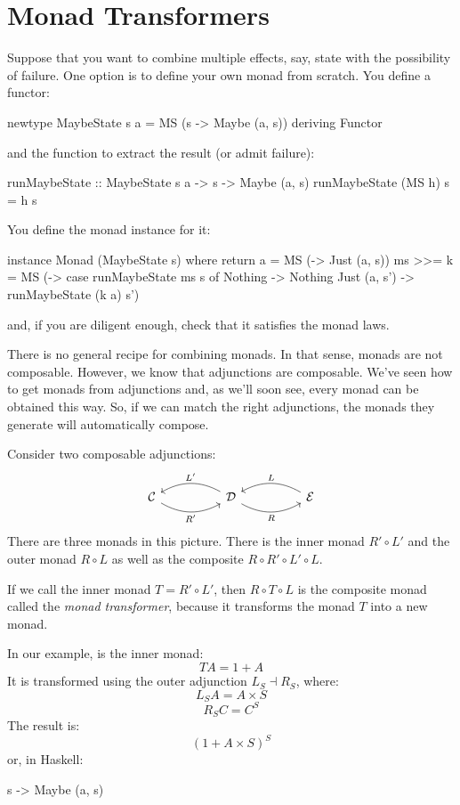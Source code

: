\documentclass[DaoFP]{subfiles}
\begin{document}
\section{Monad Transformers}

Suppose that you want to combine multiple effects, say, state with the possibility of failure. One option is to define your own monad from scratch. You define a functor:
\begin{haskell}
newtype MaybeState s a = MS (s -> Maybe (a, s))
  deriving Functor
\end{haskell}
and the function to extract the result (or admit failure):
\begin{haskell}
runMaybeState :: MaybeState s a -> s -> Maybe (a, s)
runMaybeState (MS h) s = h s
\end{haskell}
You define the monad instance for it:
\begin{haskell}
instance Monad (MaybeState s) where
  return a = MS (\s -> Just (a, s))
  ms >>= k = MS (\s -> case runMaybeState ms s of
                       Nothing -> Nothing
                       Just (a, s') -> runMaybeState (k a) s')
\end{haskell}
and, if you are diligent enough, check that it satisfies the monad laws.

There is no general recipe for combining monads. In that sense, monads are not composable. However, we know that adjunctions are composable. We've seen how to get monads from adjunctions and, as we'll soon see, every monad can be obtained this way. So, if we can match the right adjunctions, the monads they generate will automatically compose.

Consider two composable adjunctions:
\[
 \begin{tikzcd}
  \mathcal{C}
  \arrow[rr, bend right, "R'"']
  &&
  \mathcal{D}
  \arrow[ll, bend right, "L'"']
    \arrow[rr, bend right, "R"']
&&
  \mathcal{E}
  \arrow[ll, bend right, "L"']
 \end{tikzcd}
\]
There are three monads in this picture. There is the inner monad $R' \circ L'$ and the outer monad $R \circ L$ as well as the composite $R \circ R' \circ L' \circ L$. 

If we call the inner monad $T = R' \circ L'$, then $R \circ T \circ L$ is the composite monad called the \emph{monad transformer}, because it transforms the monad $T$ into a new monad. 

In our example,  is the inner monad:
\[ T A = 1 + A \]
It is transformed using the outer adjunction $L_S \dashv R_S$, where:
\[ L_S A = A \times S \]
\[ R_S C = C^S \]
The result is:
\[ (1 + A \times S)^S\]
or, in Haskell:
\begin{haskell}
s -> Maybe (a, s)
\end{haskell}
\end{document}
